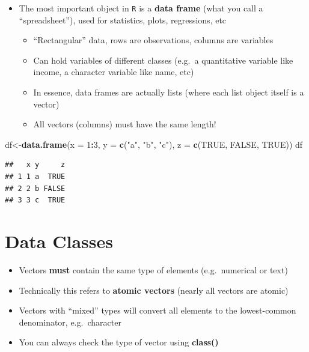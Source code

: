\documentclass[]{book}
\newenvironment{Shaded}{\begin{snugshade}}{\end{snugshade}}
\newcommand{\KeywordTok}[1]{\textcolor[rgb]{0.13,0.29,0.53}{\textbf{#1}}}
\newcommand{\DataTypeTok}[1]{\textcolor[rgb]{0.13,0.29,0.53}{#1}}
\newcommand{\DecValTok}[1]{\textcolor[rgb]{0.00,0.00,0.81}{#1}}
\newcommand{\StringTok}[1]{\textcolor[rgb]{0.31,0.60,0.02}{#1}}
\newcommand{\OtherTok}[1]{\textcolor[rgb]{0.56,0.35,0.01}{#1}}
\newcommand{\OperatorTok}[1]{\textcolor[rgb]{0.81,0.36,0.00}{\textbf{#1}}}
\newcommand{\NormalTok}[1]{#1}
\providecommand{\tightlist}{%
  \setlength{\itemsep}{0pt}\setlength{\parskip}{0pt}}
\theoremstyle{definition}
\theoremstyle{definition}
\theoremstyle{definition}
\theoremstyle{remark}
\begin{document}
\begin{itemize}
\tightlist
\item
  The most important object in \texttt{R} is a \textbf{data frame} (what
  you call a ``spreadsheet''), used for statistics, plots, regressions,
  etc

  \begin{itemize}
  \tightlist
  \item
    ``Rectangular'' data, rows are observations, columns are variables
  \item
    Can hold variables of different classes (e.g.~a quantitative
    variable like income, a character variable like name, etc)
  \item
    In essence, data frames are actually lists (where each list object
    itself is a vector)
  \item
    All vectors (columns) must have the same length!
  \end{itemize}
\end{itemize}

\begin{Shaded}
\begin{Highlighting}[]
\NormalTok{df<-}\KeywordTok{data.frame}\NormalTok{(}\DataTypeTok{x =} \DecValTok{1}\OperatorTok{:}\DecValTok{3}\NormalTok{,}
           \DataTypeTok{y =} \KeywordTok{c}\NormalTok{(}\StringTok{"a"}\NormalTok{, }\StringTok{"b"}\NormalTok{, }\StringTok{"c"}\NormalTok{),}
           \DataTypeTok{z =} \KeywordTok{c}\NormalTok{(}\OtherTok{TRUE}\NormalTok{, }\OtherTok{FALSE}\NormalTok{, }\OtherTok{TRUE}\NormalTok{))}
\NormalTok{df}
\end{Highlighting}
\end{Shaded}

\begin{verbatim}
##   x y     z
## 1 1 a  TRUE
## 2 2 b FALSE
## 3 3 c  TRUE
\end{verbatim}

\chapter{Data Classes}\label{data-classes}

\begin{itemize}
\tightlist
\item
  Vectors \textbf{must} contain the same type of elements
  (e.g.~numerical or text)
\item
  Technically this refers to \textbf{atomic vectors} (nearly all vectors
  are atomic)
\item
  Vectors with ``mixed'' types will convert all elements to the
  lowest-common denominator, e.g.~character
\item
  You can always check the type of vector using \textbf{class()}
\end{itemize}
\end{document}

